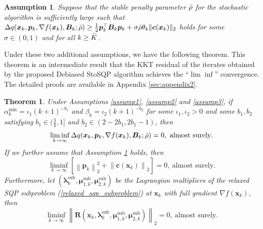 \documentclass[aos]{imsart}
\numberwithin{equation}{section}
\theoremstyle{plain}
\newtheorem{assumption}{Assumption}
\newtheorem{theorem}{Theorem}
\begin{document}
\begin{assumption}
\label{assump8}
    Suppose that the stable penalty parameter $\Bar{\rho}$ for the stochastic algorithm is sufficiently large such that 
    $\Delta q(\bm{x}_k,\bm{p}_k,\nabla f(\bm{x}_k),\bm{B}_k;\Bar{\rho}) \geq \frac{1}{2} \bm{p}_k^{\top} \bm{B}_k \bm{p}_k + \sigma \Bar{\rho} \theta_k \|\bm{c}(\bm{x}_k)\|_2$ holds for some $\sigma \in (0,1)$ and for all $k \geq \Bar{K}$. 
    
\end{assumption}

Under these two additional assumptions, we have the following theorem.
This theorem is an intermediate result that the KKT residual of the iterates obtained by the proposed Debiased StoSQP algorithm achieves the ``$\lim \inf$'' convergence. The detailed proofs are available in Appendix \ref{sec:appendix2}.

\begin{theorem}
\label{theorem_lim_inf}
    Under Assumptions \ref{assump1}, \ref{assump2} and \ref{assump3}, if $\alpha_k^{\text{min}} = \iota_1 (k+1)^{-b_1}$ and $\beta_k = \iota_2 (k+1)^{-b_2}$ for some $\iota_1, \iota_2 >0$ and some $b_1, b_2$ satisfying $b_1 \in (\frac{3}{4},1]$ and $b_2 \in \left( 2-2b_1,2b_1-1\right)$, then  
    \begin{equation*}
        \mathop{\lim \inf}_{k \to \infty} \Delta q(\bm{x}_k,\bm{p}_k,\nabla f(\bm{x}_k),\bm{B}_k;\Bar{\rho}) = 0,~\text{almost surely}.
    \end{equation*}
    If we further assume that Assumption \ref{assump8} holds, then
    \begin{equation*}
        \mathop{\lim \inf}_{k \to \infty} \left[\left\|\bm{p}_k\right\|_2^2 + \left\|\bm{c}(\bm{x}_k) \right\|_2 \right] = 0,~\text{almost surely}.
    \end{equation*}
    Furthermore, let $(\bm{\lambda}_k^{\text{sub}}, \bm{\mu}_{1,k}^{\text{sub}},\bm{\mu}_{2,k}^{\text{sub}})$ be the Lagrangian multipliers of the relaxed SQP subproblem (\ref{relaxed_sqp_subproblem}) at $\bm{x}_k$ with full gradient $\nabla f(\bm{x}_k)$, then 
    \begin{equation}
        \mathop{\lim \inf}_{k \to \infty} \left\| \bm{R}(\bm{x}_k, \bm{\lambda}_k^{\text{sub}}, \bm{\mu}_{1,k}^{\text{sub}}, \bm{\mu}_{2,k}^{\text{sub}}) \right\|_2 = 0,~\text{almost surely}.
    \end{equation}
\end{theorem}
\end{document}

